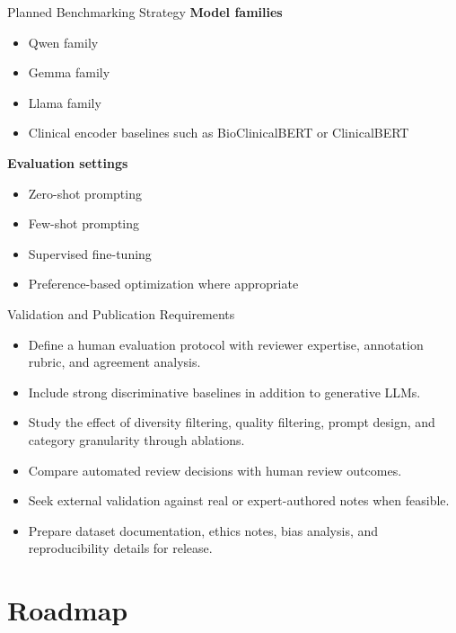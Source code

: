 \documentclass[aspectratio=169]{beamer}
\begin{document}
\begin{frame}{Planned Benchmarking Strategy}
    \small
    \textbf{Model families}
    \begin{itemize}
        \item Qwen family
        \item Gemma family
        \item Llama family
        \item Clinical encoder baselines such as BioClinicalBERT or ClinicalBERT
    \end{itemize}

    \textbf{Evaluation settings}
    \begin{itemize}
        \item Zero-shot prompting
        \item Few-shot prompting
        \item Supervised fine-tuning
        \item Preference-based optimization where appropriate
    \end{itemize}
\end{frame}

\begin{frame}{Validation and Publication Requirements}
    \small
    \begin{itemize}
        \item Define a human evaluation protocol with reviewer expertise, annotation rubric, and agreement analysis.
        \item Include strong discriminative baselines in addition to generative LLMs.
        \item Study the effect of diversity filtering, quality filtering, prompt design, and category granularity through ablations.
        \item Compare automated review decisions with human review outcomes.
        \item Seek external validation against real or expert-authored notes when feasible.
        \item Prepare dataset documentation, ethics notes, bias analysis, and reproducibility details for release.
    \end{itemize}
\end{frame}

\section{Roadmap}
\end{document}
